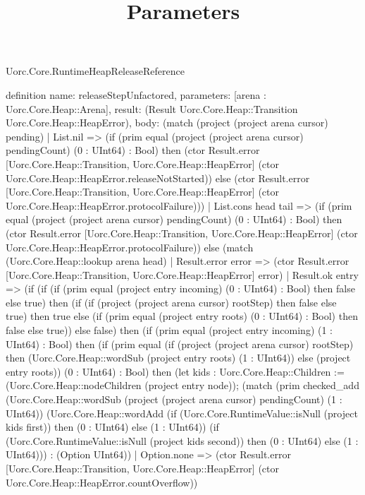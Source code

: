 \begin{lexlean}{Uorc.Core.RuntimeHeapReleaseReference}
\title{Parameters}
\begin{semanticmodule}
definition{
  name: releaseStepUnfactored,
  parameters: [arena : Uorc.Core.Heap::Arena],
  result: (Result Uorc.Core.Heap::Transition Uorc.Core.Heap::HeapError),
  body: (match (project (project arena cursor) pending)
    | List.nil => (if (prim equal (project (project arena cursor) pendingCount) (0 : UInt64) : Bool) then (ctor Result.error [Uorc.Core.Heap::Transition, Uorc.Core.Heap::HeapError] (ctor Uorc.Core.Heap::HeapError.releaseNotStarted)) else (ctor Result.error [Uorc.Core.Heap::Transition, Uorc.Core.Heap::HeapError] (ctor Uorc.Core.Heap::HeapError.protocolFailure)))
    | List.cons head tail => (if (prim equal (project (project arena cursor) pendingCount) (0 : UInt64) : Bool) then (ctor Result.error [Uorc.Core.Heap::Transition, Uorc.Core.Heap::HeapError] (ctor Uorc.Core.Heap::HeapError.protocolFailure)) else (match (Uorc.Core.Heap::lookup arena head)
      | Result.error error => (ctor Result.error [Uorc.Core.Heap::Transition, Uorc.Core.Heap::HeapError] error)
      | Result.ok entry => (if (if (if (prim equal (project entry incoming) (0 : UInt64) : Bool) then false else true) then (if (if (project (project arena cursor) rootStep) then false else true) then true else (if (prim equal (project entry roots) (0 : UInt64) : Bool) then false else true)) else false) then (if (prim equal (project entry incoming) (1 : UInt64) : Bool) then (if (prim equal (if (project (project arena cursor) rootStep) then (Uorc.Core.Heap::wordSub (project entry roots) (1 : UInt64)) else (project entry roots)) (0 : UInt64) : Bool) then (let kids : Uorc.Core.Heap::Children := (Uorc.Core.Heap::nodeChildren (project entry node)); (match (prim checked_add (Uorc.Core.Heap::wordSub (project (project arena cursor) pendingCount) (1 : UInt64)) (Uorc.Core.Heap::wordAdd (if (Uorc.Core.RuntimeValue::isNull (project kids first)) then (0 : UInt64) else (1 : UInt64)) (if (Uorc.Core.RuntimeValue::isNull (project kids second)) then (0 : UInt64) else (1 : UInt64))) : (Option UInt64))
        | Option.none => (ctor Result.error [Uorc.Core.Heap::Transition, Uorc.Core.Heap::HeapError] (ctor Uorc.Core.Heap::HeapError.countOverflow))
}
\end{semanticmodule}
\end{lexlean}
